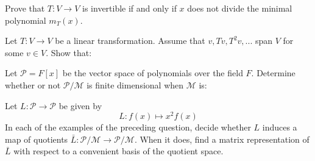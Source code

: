 \documentclass[answers]{exam}
\begin{document}
\begin{questions}
\question%
Prove that $T: V \to V$ is invertible if and only if $x$ does not divide the minimal polynomial $m_{T}(x)$.



\question%
Let $T: V \to V$ be a linear transformation. Assume that $v, T v, T^{2} v, ...$ span $V$ for some $v \in V$. Show that:



\question%
Let $\mathcal{P}=F[x]$ be the vector space of polynomials over the field $F$. Determine whether or not $\mathcal{P} / \mathcal{M}$ is finite dimensional when $\mathcal{M}$ is:



\question%
Let $L: \mathcal{P} \to \mathcal{P}$ be given by \[
	L: f(x) \mapsto x^{2} f(x)
\] In each of the examples of the preceding question, decide whether $L$ induces a map of quotients $\bar{L}: \mathcal{P} / \mathcal{M} \to \mathcal{P} / \mathcal{M}$. When it does, find a matrix representation of $\bar{L}$ with respect to a convenient basis of the quotient space.

\end{questions}
\end{document}
